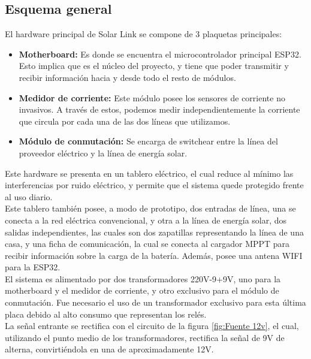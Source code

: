 \subsection{Esquema general}
El hardware principal de Solar Link se compone de 3 plaquetas principales:

\begin{itemize}
    \item \textbf{Motherboard:} Es donde se encuentra el microcontrolador principal ESP32. Esto implica que es el núcleo del proyecto, y tiene que poder transmitir y recibir información hacia y desde todo el resto de módulos.
    \item \textbf{Medidor de corriente:} Este módulo posee los sensores de corriente no invasivos. A través de estos, podemos medir independientemente la corriente que circula por cada una de las dos líneas que utilizamos.
    \item \textbf{Módulo de conmutación:} Se encarga de switchear entre la línea del proveedor eléctrico y la línea de energía solar.
\end{itemize}

Este hardware se presenta en un tablero eléctrico, el cual reduce al mínimo las interferencias por ruido eléctrico, y permite que el sistema quede protegido frente al uso diario.\\

Este tablero también posee, a modo de prototipo, dos entradas de línea, una se conecta a la red eléctrica convencional, y otra a la línea de energía solar, dos salidas independientes, las cuales son dos zapatillas representando la línea de una casa, y una ficha de comunicación, la cual se conecta al cargador MPPT para recibir información sobre la carga de la batería. Además, posee una antena WIFI para la ESP32.\\

El sistema es alimentado por dos transformadores 220V-9+9V, uno para la motherboard y el medidor de corriente, y otro exclusivo para el módulo de conmutación. Fue necesario el uso de un transformador exclusivo para esta última placa debido al alto consumo que representan los relés.\\

La señal entrante se rectifica con el circuito de la figura \ref{fig:Fuente 12v}, el cual, utilizando el punto medio de los transformadores, rectifica la señal de 9V de alterna, convirtiéndola en una de aproximadamente 12V.\\

